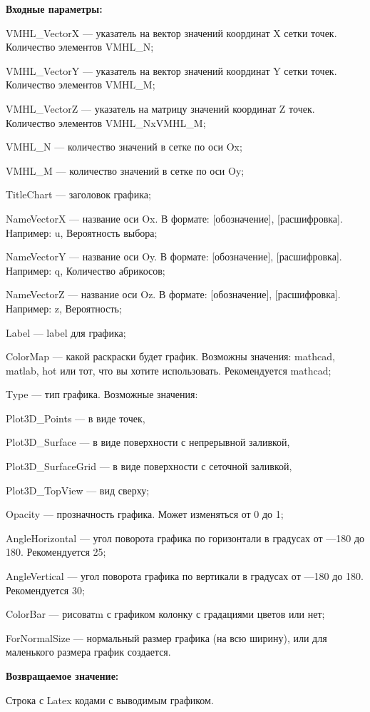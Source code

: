 \textbf{Входные параметры:}
 

 
    VMHL\_VectorX --- указатель на вектор значений координат X сетки точек. Количество элементов VMHL\_N;
 
    VMHL\_VectorY --- указатель на вектор значений координат Y сетки точек. Количество элементов VMHL\_M;
 
    VMHL\_VectorZ --- указатель на матрицу значений координат Z точек. Количество элементов VMHL\_NxVMHL\_M;
 
    VMHL\_N --- количество значений в сетке по оси Ox;
 
    VMHL\_M --- количество значений в сетке по оси Oy;
 
    TitleChart --- заголовок графика;
 
    NameVectorX --- название оси Ox. В формате: [обозначение], [расшифровка]. Например: u, Вероятность выбора;
 
    NameVectorY --- название оси Oy. В формате: [обозначение], [расшифровка]. Например: q, Количество абрикосов;
 
    NameVectorZ --- название оси Oz. В формате: [обозначение], [расшифровка]. Например: z, Вероятность;
 
    Label --- label для графика;
 
    ColorMap --- какой раскраски будет график. Возможны значения: mathcad, matlab, hot или тот, что вы хотите использовать. Рекомендуется mathcad;
 
    Type --- тип графика. Возможные значения:
 
       Plot3D\_Points --- в виде точек,
 
       Plot3D\_Surface --- в виде поверхности с непрерывной заливкой,
 
       Plot3D\_SurfaceGrid --- в виде поверхности с сеточной заливкой,
 
       Plot3D\_TopView --- вид сверху;
 
    Opacity --- прозначность графика. Может изменяться от 0 до 1;
 
    AngleHorizontal --- угол поворота графика по горизонтали в градусах от ---180 до 180. Рекомендуется 25;
 
    AngleVertical --- угол поворота графика по вертикали в градусах от ---180 до 180. Рекомендуется 30;
 
    ColorBar --- рисоватm с графиком колонку с градациями цветов или нет;
 
    ForNormalSize --- нормальный размер графика (на всю ширину), или для маленького размера график создается.
	
\textbf{Возвращаемое значение:}

Строка с Latex кодами с выводимым графиком.